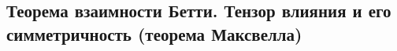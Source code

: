 

\subsection{Теорема взаимности Бетти. Тензор влияния и его симметричность (теорема Максвелла)}




